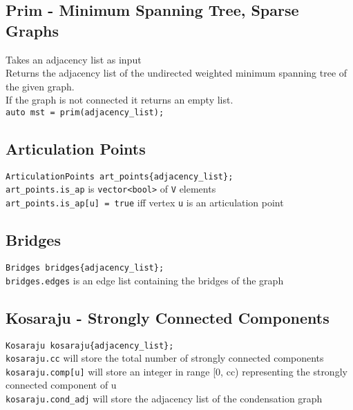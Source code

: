 \subsection{Prim - Minimum Spanning Tree, Sparse Graphs}

Takes an adjacency list as input \\
Returns the adjacency list of the undirected weighted minimum spanning tree of the given graph. \\
If the graph is not connected it returns an empty list. \\
\verb|auto mst = prim(adjacency_list);| \\



\subsection{Articulation Points}

\verb|ArticulationPoints art_points{adjacency_list};| \\
\verb|art_points.is_ap| is \verb|vector<bool>| of \verb|V| elements \\
\verb|art_points.is_ap[u] = true| iff vertex \verb|u| is an articulation point



\subsection{Bridges}

\verb|Bridges bridges{adjacency_list};| \\
\verb|bridges.edges| is an edge list containing the bridges of the graph



\subsection{Kosaraju - Strongly Connected Components}

\verb|Kosaraju kosaraju{adjacency_list};| \\
\verb|kosaraju.cc| will store the total number of strongly connected components \\
\verb|kosaraju.comp[u]| will store an integer in range [0, cc) representing the strongly connected component of u \\
\verb|kosaraju.cond_adj| will store the adjacency list of the condensation graph

